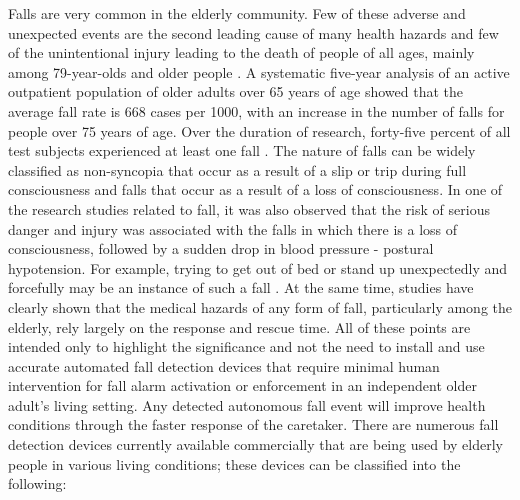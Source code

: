 Falls are very common in the elderly community. Few of these adverse and unexpected events are the second leading cause of many health hazards and few of the unintentional injury leading to the death of people of all ages, mainly among 79-year-olds and older people \cite{18}. A systematic five-year analysis of an active outpatient population of older adults over 65 years of age showed that the average fall rate is 668 cases per 1000, with an increase in the number of falls for people over 75 years of age. Over the duration of research, forty-five percent of all test subjects experienced at least one fall \cite{19}. The nature of falls can be widely classified as non-syncopia that occur as a result of a slip or trip during full consciousness and falls that occur as a result of a loss of consciousness. In one of the research studies related to fall, it was also observed that the risk of serious danger and injury was associated with the falls in which there is a loss of consciousness, followed by a sudden drop in blood pressure - postural hypotension. For example, trying to get out of bed or stand up unexpectedly and forcefully may be an instance of such a fall \cite{20}. At the same time, studies have clearly shown that the medical hazards of any form of fall, particularly among the elderly, rely largely on the response and rescue time. All of these points are intended only to highlight the significance and not the need to install and use accurate automated fall detection devices that require minimal human intervention for fall alarm activation or enforcement in an independent older adult's living setting. Any detected autonomous fall event will improve health conditions through the faster response of the caretaker. There are numerous fall detection devices currently available commercially that are being used by elderly people in various living conditions; these devices can be classified into the following:

